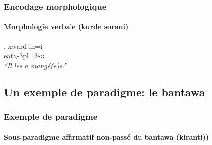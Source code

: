 \begin{frame}
\frametitle{Encodage morphologique}
\framesubtitle{Morphologie verbale (kurde sorani)}

\ex. xward-in\alert{=î} \\
eat$\backslash$\sii-{\sc 3pl}=\textsc{3sg}\\
{\em ``Il les a mangé(e)s.''}

\end{frame}

\subsection[Bantawa]{Un exemple de paradigme: le bantawa}


\begin{frame}
\frametitle{Exemple de paradigme}
\framesubtitle{Sous-paradigme affirmatif non-passé du bantawa (kiranti))}


\end{frame}



